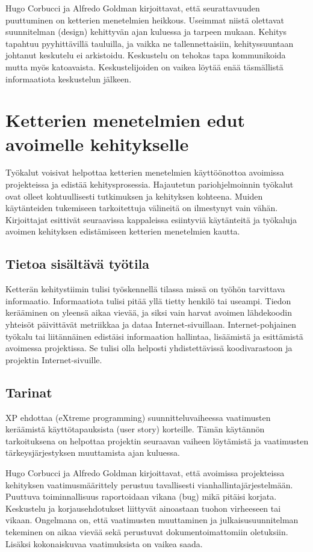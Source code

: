 \documentclass[finnish]{tktltiki2}
\theoremstyle{definition}
\theoremstyle{remark}
\begin{document}
Hugo Corbucci ja Alfredo Goldman kirjoittavat, että seurattavuuden puuttuminen on ketterien menetelmien heikkous. Useimmat niistä olettavat suunnitelman (design) kehittyvän ajan kuluessa ja tarpeen mukaan. Kehitys tapahtuu pyyhittävillä tauluilla, ja vaikka ne tallennettaisiin, kehityssuuntaan johtanut keskutelu ei arkistoidu. Keskustelu on tehokas tapa kommunikoida mutta myös katoavaista. Keskustelijoiden on vaikea löytää enää täsmällistä informaatiota keskustelun jälkeen.

\section{Ketterien menetelmien edut avoimelle kehitykselle}

Työkalut voisivat helpottaa ketterien menetelmien käyttöönottoa avoimissa projekteissa ja edistää kehitysprosessia. Hajautetun pariohjelmoinnin työkalut ovat olleet kohtuullisesti tutkimuksen ja kehityksen kohteena. Muiden käytänteiden tukemiseen tarkoitettuja välineitä on ilmestynyt vain vähän. Kirjoittajat esittivät seuraavissa kappaleissa esiintyviä käytänteitä ja työkaluja avoimen kehityksen edistämiseen ketterien menetelmien kautta.

\subsection{Tietoa sisältävä työtila}


Ketterän kehitystiimin tulisi työskennellä tilassa missä on työhön tarvittava informaatio. Informaatiota tulisi pitää yllä tietty henkilö tai useampi. Tiedon kerääminen on yleensä aikaa vievää, ja siksi vain harvat avoimen lähdekoodin yhteisöt päivittävät metriikkaa ja dataa Internet-sivuillaan. Internet-pohjainen työkalu tai liitännäinen edistäisi informaation hallintaa, lisäämistä ja esittämistä avoimessa projektissa. Se tulisi olla helposti yhdistettävissä koodivarastoon ja projektin Internet-sivuille.

\subsection{Tarinat}

XP ehdottaa (eXtreme programming) suunnitteluvaiheessa vaatimusten keräämistä käyttötapauksista (user story) korteille. Tämän käytännön tarkoituksena on helpottaa projektin seuraavan vaiheen löytämistä ja vaatimusten tärkeysjärjestyksen muuttamista ajan kuluessa. 

Hugo Corbucci ja Alfredo Goldman kirjoittavat, että avoimissa  projekteissa kehityksen vaatimusmäärittely perustuu tavallisesti vianhallintajärjestelmään. Puuttuva toiminnallisuus raportoidaan vikana (bug) mikä pitäisi korjata. Keskustelu ja korjausehdotukset liittyvät ainoastaan tuohon virheeseen tai vikaan. Ongelmana on, että vaatimusten muuttaminen ja julkaisusuunnitelman tekeminen on aikaa vievää sekä perustuvat dokumentoimattomiin oletuksiin. Lisäksi kokonaiskuvaa vaatimuksista on vaikea saada.
\end{document}
